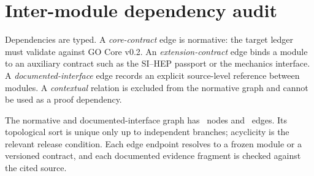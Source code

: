 \documentclass[11pt,a4paper]{article}
\theoremstyle{definition}
\theoremstyle{plain}
\theoremstyle{remark}
\begin{document}
\begin{center}
\end{center}



\section{Inter-module dependency audit}

Dependencies are typed.  A \emph{core-contract} edge is normative: the
target ledger must validate against GO Core v0.2.  An
\emph{extension-contract} edge binds a module to an auxiliary
contract such as the SI--HEP passport or the mechanics interface.  A
\emph{documented-interface} edge records an explicit source-level
reference between modules.  A \emph{contextual} relation is excluded
from the normative graph and cannot be used as a proof dependency.



The normative and documented-interface graph has
\DependencyNodeCount\ nodes and \DependencyEdgeCount\ edges.  Its
topological sort is unique only up to independent branches; acyclicity
is the relevant release condition.  Each edge endpoint resolves to a
frozen module or a versioned contract, and each documented evidence
fragment is checked against the cited source.
\end{document}
